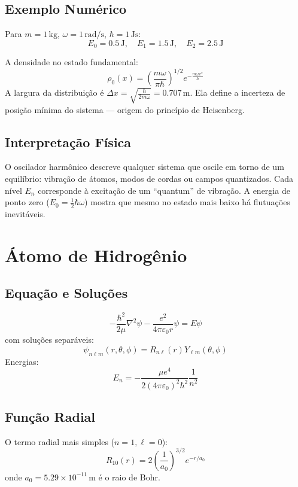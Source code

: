 \documentclass[12pt,a4paper]{article}
\begin{document}
\subsection*{Exemplo Numérico}

Para \(m=1\,\mathrm{kg}\), \(\omega=1\,\mathrm{rad/s}\), \(\hbar=1\,\mathrm{Js}\):
\[
E_0=0.5\,\mathrm{J}, \quad E_1=1.5\,\mathrm{J}, \quad E_2=2.5\,\mathrm{J}
\]

A densidade no estado fundamental:
\[
\rho_0(x)=\left(\frac{m\omega}{\pi\hbar}\right)^{1/2} e^{-\frac{m\omega x^2}{\hbar}}
\]
A largura da distribuição é \(\Delta x = \sqrt{\frac{\hbar}{2m\omega}} = 0.707\,\mathrm{m}\).  
Ela define a incerteza de posição mínima do sistema — origem do princípio de Heisenberg.

\subsection*{Interpretação Física}

O oscilador harmônico descreve qualquer sistema que oscile em torno de um equilíbrio: vibração de átomos, modos de cordas ou campos quantizados.  
Cada nível \(E_n\) corresponde à excitação de um “quantum” de vibração.  
A energia de ponto zero (\(E_0=\frac{1}{2}\hbar\omega\)) mostra que mesmo no estado mais baixo há flutuações inevitáveis.


\section{Átomo de Hidrogênio}

\subsection*{Equação e Soluções}

\[
-\frac{\hbar^2}{2\mu}\nabla^2\psi-\frac{e^2}{4\pi\varepsilon_0r}\psi=E\psi
\]
com soluções separáveis:
\[
\psi_{n\ell m}(r,\theta,\phi)=R_{n\ell}(r)Y_{\ell m}(\theta,\phi)
\]
Energias:
\[
E_n=-\frac{\mu e^4}{2(4\pi\varepsilon_0)^2\hbar^2}\frac{1}{n^2}
\]

\subsection*{Função Radial}

O termo radial mais simples (\(n=1,\ell=0\)):
\[
R_{10}(r)=2\left(\frac{1}{a_0}\right)^{3/2} e^{-r/a_0}
\]
onde \(a_0=5.29\times10^{-11}\,\mathrm{m}\) é o raio de Bohr.
\end{document}
